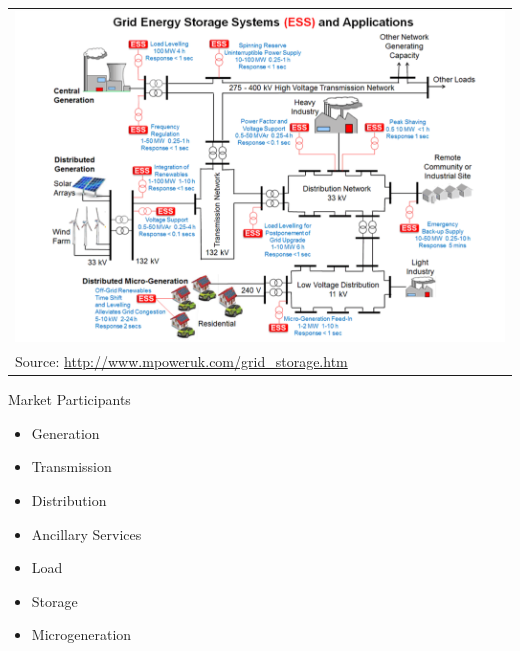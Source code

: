 \documentclass[aspectratio=169]{beamer}
\renewcommand{\(}{\begin{columns}}
\renewcommand{\)}{\end{columns}}
\newcommand{\<}[1]{\begin{column}{#1}}
\renewcommand{\>}{\end{column}}
\begin{document}
\begin{frame}

\begin{tabular}{p{\linewidth}}
    \centering
    \includegraphics[width=.75\linewidth]{../images/grid_storage.png} \\[\abovecaptionskip]
  Source: \url{http://www.mpoweruk.com/grid_storage.htm}
\end{tabular}

\end{frame}

\begin{frame}{Market Participants}
\begin{itemize}
\setlength\itemsep{1.2em}
\item Generation

\item Transmission

\item Distribution

\item Ancillary Services

\item Load

\item Storage

\item Microgeneration
\end{itemize}

\vfill \end{frame}
\end{document}
